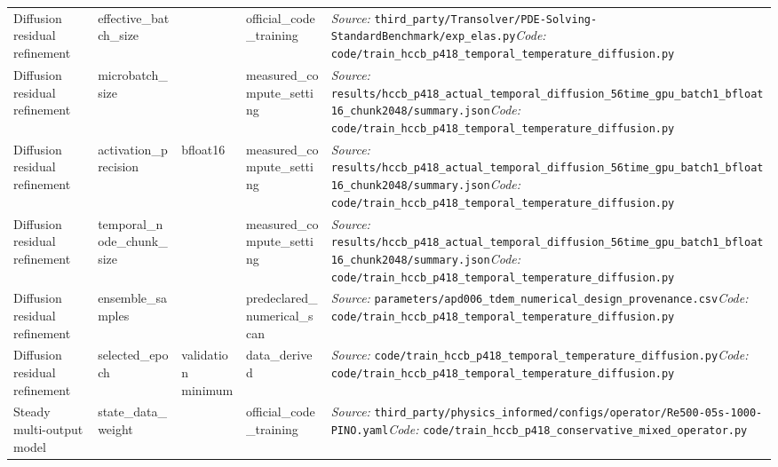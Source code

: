 \begin{longtable}{>{\raggedright\arraybackslash}p{2.7cm}>{\raggedright\arraybackslash}p{3.2cm}>{\raggedright\arraybackslash}p{1.5cm}>{\raggedright\arraybackslash}p{2.6cm}>{\raggedright\arraybackslash}p{8.0cm}}
Diffusion residual refinement & effective\_\allowbreak{}batch\_\allowbreak{}size & 8 & official\_\allowbreak{}code\_\allowbreak{}training & \textit{Source:} \nolinkurl{third_party/Transolver/PDE-Solving-StandardBenchmark/exp_elas.py}\newline \textit{Code:} \nolinkurl{code/train_hccb_p418_temporal_temperature_diffusion.py} \\
Diffusion residual refinement & microbatch\_\allowbreak{}size & 1 & measured\_\allowbreak{}compute\_\allowbreak{}setting & \textit{Source:} \nolinkurl{results/hccb_p418_actual_temporal_diffusion_56time_gpu_batch1_bfloat16_chunk2048/summary.json}\newline \textit{Code:} \nolinkurl{code/train_hccb_p418_temporal_temperature_diffusion.py} \\
Diffusion residual refinement & activation\_\allowbreak{}precision & bfloat16 & measured\_\allowbreak{}compute\_\allowbreak{}setting & \textit{Source:} \nolinkurl{results/hccb_p418_actual_temporal_diffusion_56time_gpu_batch1_bfloat16_chunk2048/summary.json}\newline \textit{Code:} \nolinkurl{code/train_hccb_p418_temporal_temperature_diffusion.py} \\
Diffusion residual refinement & temporal\_\allowbreak{}node\_\allowbreak{}chunk\_\allowbreak{}size & 2048 & measured\_\allowbreak{}compute\_\allowbreak{}setting & \textit{Source:} \nolinkurl{results/hccb_p418_actual_temporal_diffusion_56time_gpu_batch1_bfloat16_chunk2048/summary.json}\newline \textit{Code:} \nolinkurl{code/train_hccb_p418_temporal_temperature_diffusion.py} \\
Diffusion residual refinement & ensemble\_\allowbreak{}samples & 32 & predeclared\_\allowbreak{}numerical\_\allowbreak{}scan & \textit{Source:} \nolinkurl{parameters/apd006_tdem_numerical_design_provenance.csv}\newline \textit{Code:} \nolinkurl{code/train_hccb_p418_temporal_temperature_diffusion.py} \\
Diffusion residual refinement & selected\_\allowbreak{}epoch & validation minimum & data\_\allowbreak{}derived & \textit{Source:} \nolinkurl{code/train_hccb_p418_temporal_temperature_diffusion.py}\newline \textit{Code:} \nolinkurl{code/train_hccb_p418_temporal_temperature_diffusion.py} \\
Steady multi-output model & state\_\allowbreak{}data\_\allowbreak{}weight & 5.0 & official\_\allowbreak{}code\_\allowbreak{}training & \textit{Source:} \nolinkurl{third_party/physics_informed/configs/operator/Re500-05s-1000-PINO.yaml}\newline \textit{Code:} \nolinkurl{code/train_hccb_p418_conservative_mixed_operator.py} \\

\end{longtable}
